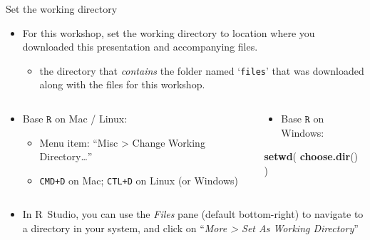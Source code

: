 \documentclass[
  11pt,
  ignorenonframetext,
]{beamer}
\newenvironment{Shaded}{\begin{snugshade}}{\end{snugshade}}
\newcommand{\FunctionTok}[1]{\textcolor[rgb]{0.13,0.29,0.53}{\textbf{#1}}}
\newcommand{\NormalTok}[1]{#1}
\providecommand{\tightlist}{%
  \setlength{\itemsep}{0pt}\setlength{\parskip}{0pt}}
\newcommand{\R}{\texttt{R}}
\begin{document}
\begin{frame}[fragile]{Set the working directory}
\protect\hypertarget{set-the-working-directory}{}
\begin{itemize}
\tightlist
\item
  For this workshop, set the working directory to location where you
  downloaded this presentation and accompanying files.

  \begin{itemize}
  \tightlist
  \item
    the directory that \emph{contains} the folder named `\texttt{files}'
    that was downloaded along with the files for this workshop.
  \end{itemize}
\end{itemize}

\begin{columns}[T,onlytextwidth]
\begin{column}{0.58\textwidth}
\begin{itemize}
\item
  Base \(\R\) on Mac / Linux:

  \begin{itemize}
  \tightlist
  \item
    Menu item: ``Misc \textgreater{} Change Working Directory\ldots{}''
  \item
    \texttt{CMD+D} on Mac; \texttt{CTL+D} on Linux (or Windows)
  \end{itemize}
\end{itemize}
\end{column}

\begin{column}{0.38\textwidth}
\begin{itemize}
\tightlist
\item
  Base \(\R\) on Windows:
\end{itemize}

\begin{Shaded}
\begin{Highlighting}[]
\FunctionTok{setwd}\NormalTok{( }\FunctionTok{choose.dir}\NormalTok{() )}
\end{Highlighting}
\end{Shaded}
\end{column}
\end{columns}

\medskip

\begin{columns}[T,onlytextwidth]
\begin{column}{0.58\textwidth}
\begin{itemize}
\tightlist
\item
  In R~Studio, you can use the \emph{Files} pane (default bottom-right)
  to navigate to a directory in your system, and click on ``\emph{More
  \textgreater{} Set As Working Directory}''


\end{itemize}
\end{column}
\end{columns}
\end{frame}
\end{document}
